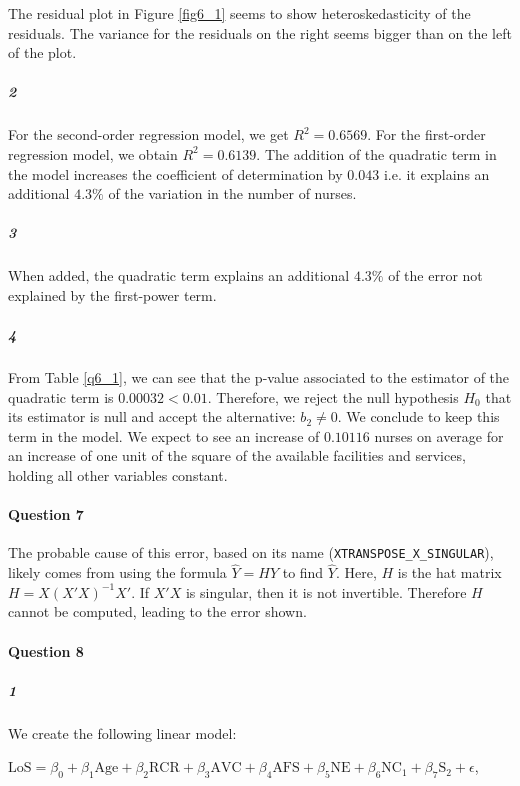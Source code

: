 \documentclass[]{article}
\let\oldparagraph\paragraph
\renewcommand{\paragraph}[1]{\oldparagraph{#1}\mbox{}}
\let\oldsubparagraph\subparagraph
\renewcommand{\subparagraph}[1]{\oldsubparagraph{#1}\mbox{}}
\begin{document}
The residual plot in Figure \ref{fig6_1} seems to show heteroskedasticity of the residuals. The variance for the residuals on the right seems bigger than on the left of the plot.

\subparagraph{\Large 2}\normalsize

For the second-order regression model, we get $R^2 = 0.6569$. For the first-order regression model, we obtain $R^2 = 0.6139$. The addition of the quadratic term in the model increases the coefficient of determination by $0.043$ i.e. it explains an additional $4.3\%$ of the variation in the number of nurses. 

\subparagraph{\Large 3}\normalsize

When added, the quadratic term explains an additional $4.3\%$ of the error not explained by the first-power term.

\subparagraph{\Large 4}\normalsize

From Table \ref{q6_1}, we can see that the p-value associated to the estimator of the quadratic term is $0.00032 < 0.01$. Therefore, we reject the null hypothesis $H_0$ that its estimator is null and accept the alternative: $b_2 \neq 0$. We conclude to keep this term in the model. We expect to see an increase of $0.10116$ nurses on average for an increase of one unit of the square of the available facilities and services, holding all other variables constant.

\paragraph{\Large Question 7}\normalsize

The probable cause of this error, based on its name (\texttt{XTRANSPOSE\_X\_SINGULAR}), likely comes from using the formula $\hat{Y} = HY$ to find $\hat{Y}$. Here, $H$ is the hat matrix $H = X(X'X)^{-1}X'$. If $X'X$ is singular, then it is not invertible. Therefore $H$ cannot be computed, leading to the error shown.

\paragraph{\Large Question 8}\normalsize
\subparagraph{\Large 1}\normalsize

We create the following linear model:

$\text{LoS} = \beta_0 + \beta_1 \text{Age} + \beta_2 \text{RCR}+ \beta_3 \text{AVC}+ \beta_4 \text{AFS} + \beta_5 \text{NE} + \beta_6 \text{NC}_1 + \beta_7 \text{S}_2 + \epsilon$,
\end{document}
